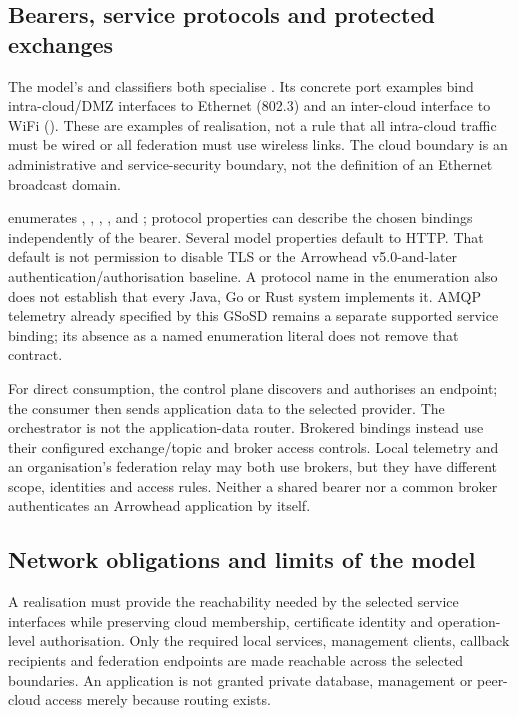 \subsection{Bearers, service protocols and protected exchanges}
The model's  and  classifiers both specialise . Its concrete port examples bind intra-cloud/DMZ interfaces to Ethernet (802.3) and an inter-cloud interface to WiFi (). These are examples of realisation, not a rule that all intra-cloud traffic must be wired or all federation must use wireless links. The cloud boundary is an administrative and service-security boundary, not the definition of an Ethernet broadcast domain.

 enumerates , , , ,  and ; protocol properties can describe the chosen bindings independently of the bearer. Several model properties default to HTTP. That default is not permission to disable TLS or the Arrowhead v5.0-and-later authentication/authorisation baseline. A protocol name in the enumeration also does not establish that every Java, Go or Rust system implements it. AMQP telemetry already specified by this GSoSD remains a separate supported service binding; its absence as a named enumeration literal does not remove that contract.

For direct consumption, the control plane discovers and authorises an endpoint; the consumer then sends application data to the selected provider. The orchestrator is not the application-data router. Brokered bindings instead use their configured exchange/topic and broker access controls. Local telemetry and an organisation's federation relay may both use brokers, but they have different scope, identities and access rules. Neither a shared bearer nor a common broker authenticates an Arrowhead application by itself.

\subsection{Network obligations and limits of the model}
A realisation must provide the reachability needed by the selected service interfaces while preserving cloud membership, certificate identity and operation-level authorisation. Only the required local services, management clients, callback recipients and federation endpoints are made reachable across the selected boundaries. An application is not granted private database, management or peer-cloud access merely because routing exists.

